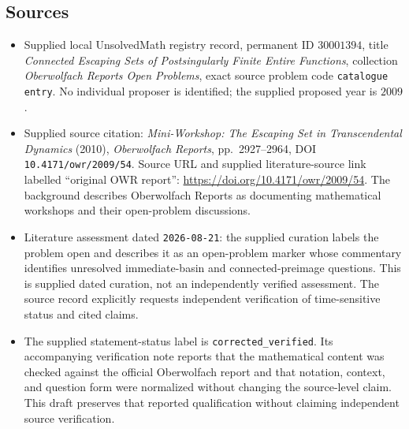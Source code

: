 \documentclass[11pt]{article}
\begin{document}
\subsection{Sources}
\begin{itemize}
\item Supplied local UnsolvedMath registry record, permanent ID \(30001394\), title \emph{Connected Escaping Sets of Postsingularly Finite Entire Functions}, collection \emph{Oberwolfach Reports Open Problems}, exact source problem code \texttt{catalogue entry}. No individual proposer is identified; the supplied proposed year is \(2009\).
\item Supplied source citation: \emph{Mini-Workshop: The Escaping Set in Transcendental Dynamics} (2010), \emph{Oberwolfach Reports}, pp.\ 2927--2964, DOI \texttt{10.4171/owr/2009/54}. Source URL and supplied literature-source link labelled ``original OWR report'': \url{https://doi.org/10.4171/owr/2009/54}. The background describes Oberwolfach Reports as documenting mathematical workshops and their open-problem discussions.
\item Literature assessment dated \texttt{2026-08-21}: the supplied curation labels the problem open and describes it as an open-problem marker whose commentary identifies unresolved immediate-basin and connected-preimage questions. This is supplied dated curation, not an independently verified assessment. The source record explicitly requests independent verification of time-sensitive status and cited claims.
\item The supplied statement-status label is \texttt{corrected\_verified}. Its accompanying verification note reports that the mathematical content was checked against the official Oberwolfach report and that notation, context, and question form were normalized without changing the source-level claim. This draft preserves that reported qualification without claiming independent source verification.
\end{itemize}
\end{document}
